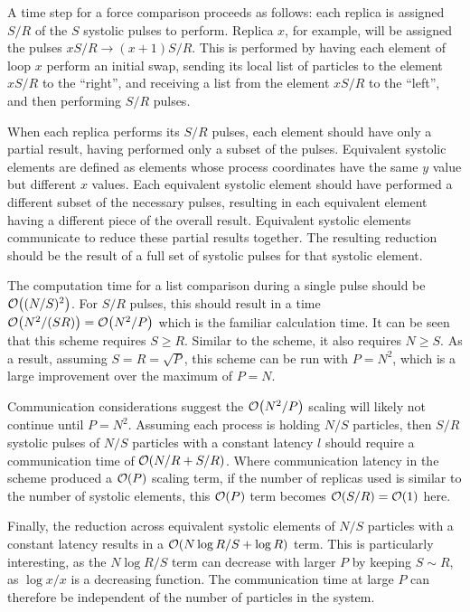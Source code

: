 A time step for a force comparison proceeds as follows:
each replica is assigned $S/R$ of the $S$ systolic pulses to
perform.
%
Replica $x$, for example, will be assigned the pulses
$xS/R \rightarrow{} (x+1)S/R$.
%
This is performed by having each element of loop $x$ perform an initial
swap, sending its local list of particles to
the element $xS/R$ to the ``right'',
and receiving a list from the element $xS/R$ to the ``left'',
and then performing $S/R$ pulses.

When each replica performs its $S/R$ pulses, each element
should have only a partial result, having performed only a subset
of the pulses.
%
Equivalent systolic elements are defined as elements whose
process coordinates have the same $y$ value but different $x$ values.
%
Each equivalent systolic element should have performed a different
subset of the necessary pulses, resulting in each equivalent element
having a different piece of the overall result.
%
Equivalent systolic elements communicate to
reduce these partial results together.
%
The resulting reduction should be the result of a full set of systolic pulses
for that systolic element.



The computation time for a list comparison during a single pulse
should be $\mathcal{O}{\left({ (N/S)^2 }\right)}$.
%
For $S/R$ pulses, this should result in a time $\mathcal{O}{\left({ N^2/(SR) }\right)} = \mathcal{O}{\left({ N^2/P }\right)}$
which is the familiar \systolicloop{} calculation time.
%
It can be seen that this scheme requires $S \ge{} R$.
%
Similar to the \systolicloop{} scheme, it also requires $N \ge{} S$.
%
As a result, assuming $S = R = \sqrt{P}$, this scheme can be run
with $P = N^2$, which is a large improvement over the \systolicloop{}
maximum of $P = N$.



Communication considerations suggest the $\mathcal{O}{\left({ N^2/P }\right)}$ scaling
will likely not continue until $P = N^2$.
%
Assuming each process is holding $N/S$ particles, then $S/R$
systolic pulses of $N/S$ particles with a constant latency $l$
should require a communication time of $\mathcal{O}{\left({ N/R + S/R }\right)}$.
%
Where communication latency in the \systolicloop{} scheme produced
a $\mathcal{O}{\left({ P }\right)}$ scaling term, if the number of replicas used is
similar to the number of systolic elements, this $\mathcal{O}{\left({ P }\right)}$ term
becomes $\mathcal{O}{\left({ S/R }\right)} = \mathcal{O}{\left({ 1 }\right)}$ here.

Finally, the reduction across equivalent systolic elements of
$N/S$ particles with a constant latency results in a
$\mathcal{O}{\left({ N\log{R}/S + \log{R} }\right)}$ term.
%
This is particularly interesting, as the $N\log{R}/S$ term can
decrease with larger $P$ by keeping $S \sim{} R$,
as $\log{x}/x$ is a decreasing function.
%
The communication time at large $P$ can therefore be independent
of the number of particles in the system.

